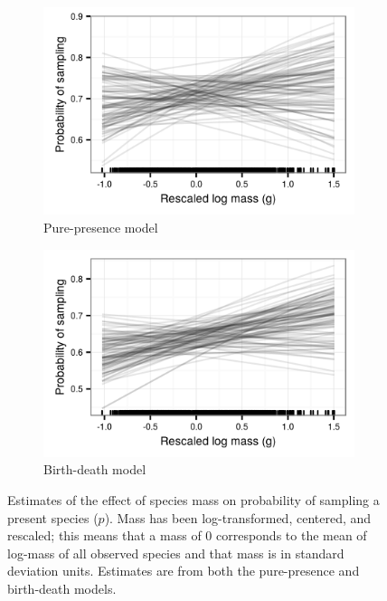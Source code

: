 \begin{figure}[ht]
  \begin{subfigure}[b]{0.45\textwidth}
    \includegraphics[width=\textwidth,height=0.4\textheight,keepaspectratio=true]{chapter_coping/figure/mass_on_samp}
    \caption{Pure-presence model}
    \label{fig:mass_preserve_pure_pres}
  \end{subfigure}
  \begin{subfigure}[b]{0.45\textwidth}
    \includegraphics[width=\textwidth,height=0.4\textheight,keepaspectratio=true]{chapter_coping/figure/mass_on_samp_bd}
    \caption{Birth-death model}
    \label{fig:mass_preserve_bd}
  \end{subfigure}
  \caption[Estimates of the effect of mass on observation probability]{Estimates of the effect of species mass on probability of sampling a present species (\(p\)). Mass has been log-transformed, centered, and rescaled; this means that a mass of 0 corresponds to the mean of log-mass of all observed species and that mass is in standard deviation units. Estimates are from both the pure-presence and birth-death models.}
  \label{fig:mass_preserve}
\end{figure}

